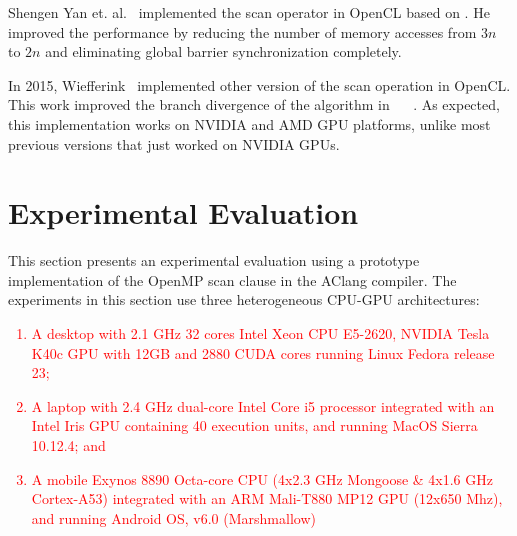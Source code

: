\documentclass[Ingles]{ic-tese-v1}
\newcommand{\ed}[1]{\noindent\textcolor{red}{ {#1}}}
\newcommand{\ed}[1]{}
\begin{document}
Shengen Yan et.  al.~\cite{Yan:2013}  implemented the scan operator in
OpenCL based on \cite{harris2007parallel}.  He improved the performance
by  reducing the  number  of memory  accesses from  $3n$  to $2n$  and
eliminating global barrier synchronization completely.

In 2015, Wiefferink~\cite{ScanOpenCL} implemented other version of the
scan operation in OpenCL.  This work improved the branch divergence of
the  algorithm in  ~\cite{ScanAsPrimitive} ~\cite{harris2007parallel}.
As  expected,  this  implementation  works   on  NVIDIA  and  AMD  GPU
platforms, unlike  most previous versions  that just worked  on NVIDIA
GPUs.

\chapter{Experimental Evaluation}
\label{cap:Experiments}

This  section presents  an experimental  evaluation using  a prototype
implementation of  the OpenMP scan  clause in the AClang compiler.
The  experiments in this section  use  three   heterogeneous  CPU-GPU
architectures:

\ed{
\begin{enumerate}
	\item A desktop with 2.1 GHz 32 cores Intel Xeon CPU E5-2620,
	NVIDIA Tesla K40c GPU with 12GB and 2880 CUDA cores  running
	Linux Fedora  release 23;
	\item  A laptop  with  2.4  GHz dual-core  Intel  Core  i5  processor
	integrated with an Intel Iris GPU containing 40 execution units, and
	running MacOS Sierra 10.12.4; and
	\item A mobile  Exynos 8890 Octa-core  CPU (4x2.3 GHz Mongoose  \& 4x1.6
	GHz Cortex-A53)  integrated with an  ARM Mali-T880 MP12  GPU (12x650
	Mhz), and running Android OS, v6.0 (Marshmallow)
\end{enumerate}}
\end{document}
